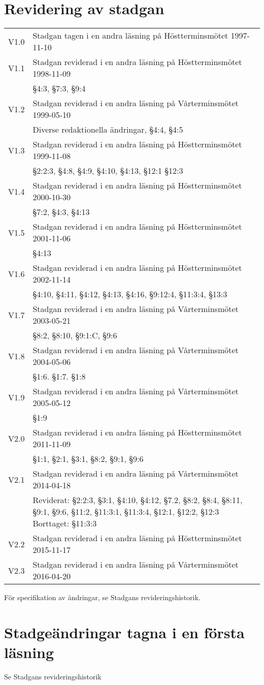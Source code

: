 \documentclass[10pt]{article}
\begin{document}
\newpage
\section*{Revidering av stadgan}

\renewcommand*\arraystretch{1}
\begin{tabular}{p{7mm} p{110mm}}
    V1.0 & Stadgan tagen i en andra läsning på Höstterminsmötet 1997-11-10\\
    V1.1 & Stadgan reviderad i en andra läsning på Höstterminsmötet 1998-11-09\\
    & §4:3, §7:3, §9:4\\
    V1.2 & Stadgan reviderad i en andra läsning på Vårterminsmötet 1999-05-10\\
    & Diverse redaktionella ändringar, §4:4, §4:5 \\
    V1.3 & Stadgan reviderad i en andra läsning på Höstterminsmötet 1999-11-08\\
    & §2:2:3, §4:8, §4:9, §4:10, §4:13, §12:1 §12:3\\
    V1.4 & Stadgan reviderad i en andra läsning på Höstterminsmötet 2000-10-30\\
    & §7:2, §4:3, §4:13\\
    V1.5 & Stadgan reviderad i en andra läsning på Höstterminsmötet 2001-11-06\\
    & §4:13\\
    V1.6 & Stadgan reviderad i en andra läsning på Höstterminsmötet 2002-11-14\\
    & §4:10, §4:11, §4:12, §4:13, §4:16, §9:12:4, §11:3:4, §13:3\\
    V1.7 & Stadgan reviderad i en andra läsning på Vårterminsmötet 2003-05-21\\
    & §8:2, §8:10, §9:1:C, §9:6 \\
    V1.8 & Stadgan reviderad i en andra läsning på Vårterminsmötet 2004-05-06\\
    & §1:6. §1:7. §1:8	\\
    V1.9 & Stadgan reviderad i en andra läsning på Vårterminsmötet 2005-05-12\\
    & §1:9\\
    V2.0 & Stadgan reviderad i en andra läsning på Höstterminsmötet 2011-11-09\\
    & §1:1, §2:1, §3:1, §8:2, §9:1, §9:6\\
     V2.1 & Stadgan reviderad i en andra läsning på Vårterminsmötet 2014-04-18\\
    & Reviderat: §2:2:3, §3:1, §4:10, §4:12, §7.2, §8:2, §8:4, §8:11, §9:1, §9:6, §11:2, §11:3:1,
    §11:3:4, §12:1, §12:2, §12:3
    Borttaget: §11:3:3\\
    V2.2 & Stadgan reviderad i en andra läsning på Höstterminsmötet 2015-11-17\\
    V2.3 & Stadgan reviderad i en andra läsning på Vårterminsmötet 2016-04-20\\
\end{tabular}
\renewcommand*\arraystretch{1.3}

För specifikation av ändringar, se Stadgans revideringshistorik.

\section*{Stadgeändringar tagna i en första läsning}

Se Stadgans revideringshistorik
\end{document}

